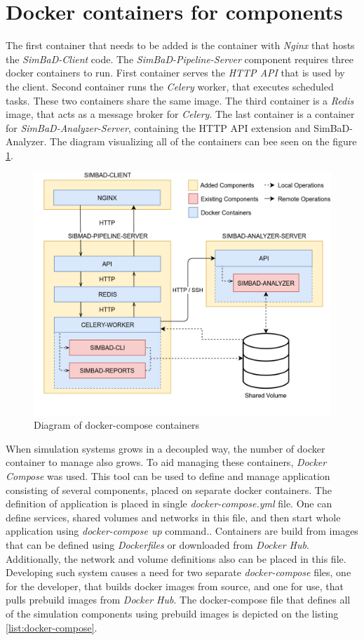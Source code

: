 \section{Docker containers for components}
\label{section:containers}
The first container that needs to be added is the container with \textit{Nginx} that hosts the \textit{SimBaD-Client} code. The \textit{SimBaD-Pipeline-Server} component requires three docker containers to run. First container serves the \textit{HTTP API} that is used by the client. Second container runs the \textit{Celery} worker, that executes scheduled tasks. These two containers share the same image. The third container is a \textit{Redis} image, that acts as a message broker for \textit{Celery}. The last container is a container for \textit{SimBaD-Analyzer-Server}, containing the HTTP API extension and SimBaD-Analyzer. The diagram visualizing all of the containers can bee seen on the figure \ref{fig:docker-containers}.
\begin{figure}[h!]
	\centering
		\includegraphics[width=0.9\linewidth]{diagrams/docker.png}
	\caption{Diagram of docker-compose containers}
	\label{fig:docker-containers}
\end{figure}
When simulation systems grows in a decoupled way, the number of docker container to manage also grows. To aid managing these containers, \textit{Docker Compose} was used. This tool can be used to define and manage application consisting of several components, placed on separate docker containers. The definition of application is placed in single \textit{docker-compose.yml} file. One can define services, shared volumes and networks in this file, and then start whole application using \textit{docker-compose up} command.. Containers are build from images that can be defined using \textit{Dockerfiles} or downloaded from \textit{Docker Hub}. Additionally, the network and volume definitions also can be placed in this file. Developing such system causes a need for two separate \textit{docker-compose} files, one for the developer, that builds docker images from source, and one for use, that pulls prebuild images from \textit{Docker Hub}. The docker-compose file that defines all of the simulation components using prebuild images is depicted on the listing \ref{list:docker-compose}. 
